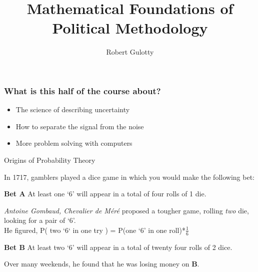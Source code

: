 \documentclass[handout]{beamer}
\title[PLSC 43401]{Mathematical Foundations of Political Methodology}
\author{Robert Gulotty}
\institute[Chicago]{University of Chicago}
\numberwithin{equation}{section}
\begin{document}
\begin{frame}
\maketitle
\end{frame}
\begin{frame}
\frametitle{What is this half of the course about?}
\begin{itemize}
\item The science of describing uncertainty
\item How to separate the signal from the noise
\item More problem solving with computers
\end{itemize}
\end{frame}


\begin{frame}{Origins of Probability Theory}

In 1717, gamblers played a dice game in which you would make the following bet:
\begin{tcolorbox}
\textbf{Bet A} At least one `6' will appear in a total of four rolls of 1 die.\\
\end{tcolorbox}
\pause
\emph{Antoine Gombaud, Chevalier de M\'{e}r\'{e}} proposed a tougher game, rolling \emph{two} die, looking for a pair of `6'.\\
\pause
He figured, P( two `6` in one try ) =  P(one `6' in one roll)*$\frac{1}{6}$
\pause  

\begin{tcolorbox}
\textbf{Bet B}  At least two `6' will appear in a total of twenty four rolls of 2 dice.
\end{tcolorbox}
\pause
 Over many weekends, he found that he was \alert{losing money} on \textbf{B}.  

\end{frame}
\end{document}
